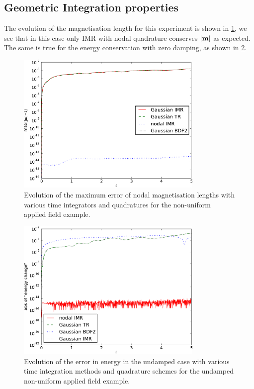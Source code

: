 

\subsection{Geometric Integration properties}


The evolution of the magnetisation length for this experiment is shown in \cref{fig:nonuniform-h-ml-error}, we see that in this case only IMR with nodal quadrature conserves $\left|{\boldsymbol{\mathrm{m}}} \right|$ as expected.
The same is true for the energy conservation with zero damping, as shown in \cref{fig:nonuniform-h-energy-error}.

\begin{figure}
  \centering
  \includegraphics[width=0.8\textwidth]
  {plots/nonuniform-h-ml/mlengtherrormaxesvstimes.pdf}
  \caption{Evolution of the maximum error of nodal magnetisation lengths with various time integrators and quadratures for the non-uniform applied field example.}
  \label{fig:nonuniform-h-ml-error}
\end{figure}


\begin{figure}
  \centering
  \includegraphics[width=0.8\textwidth]
  {plots/nonuniform-h-energy-change/absofenergychangevstimes.pdf}
  \caption{Evolution of the error in energy in the undamped case with various time integration methods and quadrature schemes for the undamped non-uniform applied field example.}
  \label{fig:nonuniform-h-energy-error}
\end{figure}




